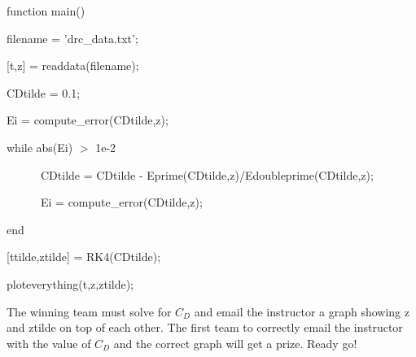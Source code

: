 \begin{enumerate}
\begin{enumerate}
\begin{framed}

function main()

filename = 'drc\_data.txt';

[t,z] = readdata(filename);

CDtilde = 0.1;

Ei = compute\_error(CDtilde,z);

while abs(Ei) $>$ 1e-2

~~~~~~CDtilde = CDtilde - Eprime(CDtilde,z)/Edoubleprime(CDtilde,z);

~~~~~~Ei = compute\_error(CDtilde,z);

end

[ttilde,ztilde] = RK4(CDtilde);

ploteverything(t,z,ztilde);

\end{framed}

\end{enumerate}

The winning team must solve for $C_D$ and email the instructor a graph
showing z and ztilde on top of each other. The first team to correctly
email the instructor with the value of $C_D$ and the correct graph
will get a prize. Ready go!

\end{enumerate}


